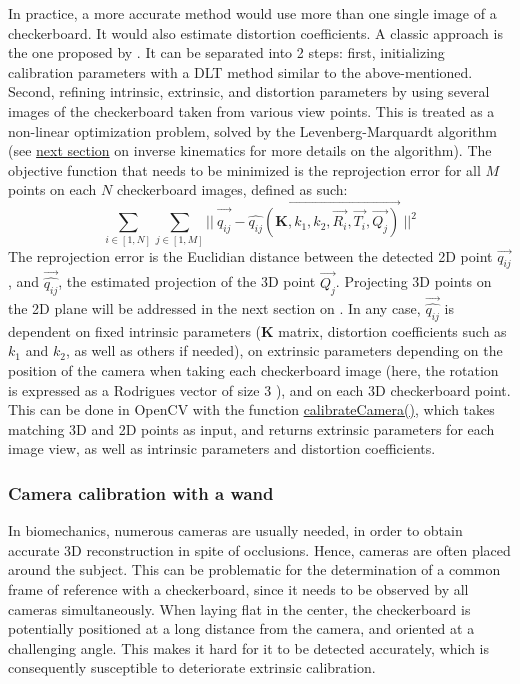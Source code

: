 In practice, a more accurate method would use more than one single image of a checkerboard. It would also estimate distortion coefficients. A classic approach is the one proposed by \cite{Zhang2000}. It can be separated into 2 steps: first, initializing calibration parameters with a DLT method similar to the above-mentioned. Second, refining intrinsic, extrinsic, and distortion parameters by using several images of the checkerboard taken from various view points. This is treated as a non-linear optimization problem, solved by the Levenberg-Marquardt algorithm \cite{Marquardt1963,More1978} (see \hyperref[levenberg]{next section} on inverse kinematics for more details on the algorithm). The objective function that needs to be minimized is the reprojection error for all $M$ points on each $N$ checkerboard images, defined as such:
\begin{equation}\label{eq:LM_algo}
  \sum_{i \in [1,N]} \sum_{j \in [1,M]} 
  ||\ \overrightarrow{q_{ij}^{\ ^{\ ^{\ ^{\ }}}}} -
  \overrightarrow{\widehat{q_{ij}}(\textbf{K},k_1,k_2,\overrightarrow{R_i},\overrightarrow{T_i},\overrightarrow{Q_j})}\ 
  ||^2
\end{equation} 
The reprojection error is the Euclidian distance between the detected 2D point $\overrightarrow{q_{ij}}$, and $\overrightarrow{\widehat{q_{ij}}}$, the estimated projection of the 3D point $\overrightarrow{Q_j}$. Projecting 3D points on the 2D plane will be addressed in the next section on . In any case, $\overrightarrow{\widehat{q_{ij}}}$ is dependent on fixed intrinsic parameters (\textbf{K} matrix, distortion coefficients such as $k_1$ and $k_2$, as well as others if needed), on extrinsic parameters depending on the position of the camera when taking each checkerboard image (here, the rotation is expressed as a Rodrigues vector of size 3 \cite{Gallego2015}), and on each 3D checkerboard point. This can be done in OpenCV with the function \href{https://docs.opencv.org/4.x/d9/d0c/group__calib3d.html#ga3207604e4b1a1758aa66acb6ed5aa65d}{calibrateCamera()}, which takes matching 3D and 2D points as input, and returns extrinsic parameters for each image view, as well as intrinsic parameters and distortion coefficients.

\subsubsection{Camera calibration with a wand} 

In biomechanics, numerous cameras are usually needed, in order to obtain accurate 3D reconstruction in spite of occlusions. Hence, cameras are often placed around the subject. This can be problematic for the determination of a common frame of reference with a checkerboard, since it needs to be observed by all cameras simultaneously. When laying flat in the center, the checkerboard is potentially positioned at a long distance from the camera, and oriented at a challenging angle. This makes it hard for it to be detected accurately, which is consequently susceptible to deteriorate extrinsic calibration. 

